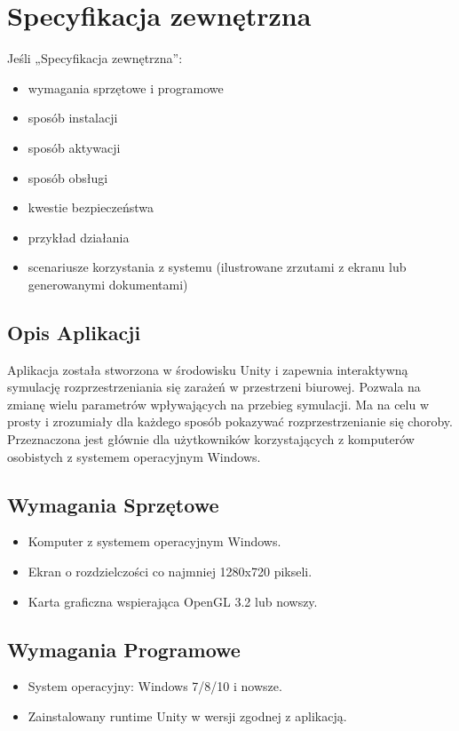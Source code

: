 \chapter{Specyfikacja zewnętrzna}
\label{ch:04}

Jeśli „Specyfikacja zewnętrzna”:
\begin{itemize}
\item  wymagania sprzętowe i programowe
\item  sposób instalacji
\item  sposób aktywacji
\item  sposób obsługi
\item  kwestie bezpieczeństwa
\item  przykład działania
\item  scenariusze korzystania z systemu (ilustrowane zrzutami z ekranu lub generowanymi dokumentami)
\end{itemize}


\section{Opis Aplikacji}

Aplikacja została stworzona w środowisku Unity i zapewnia interaktywną symulację rozprzestrzeniania się zarażeń w przestrzeni biurowej. Pozwala na zmianę wielu parametrów wpływających na przebieg symulacji. Ma na celu w prosty i zrozumiały dla każdego sposób pokazywać rozprzestrzenianie się choroby. Przeznaczona jest głównie dla użytkowników korzystających z komputerów osobistych z systemem operacyjnym Windows.

\section{Wymagania Sprzętowe}

\begin{itemize}
	\item Komputer z systemem operacyjnym Windows.
	\item Ekran o rozdzielczości co najmniej 1280x720 pikseli.
	\item Karta graficzna wspierająca OpenGL 3.2 lub nowszy.
\end{itemize}

\section{Wymagania Programowe}

\begin{itemize}
	\item System operacyjny: Windows 7/8/10 i nowsze.
	\item Zainstalowany runtime Unity w wersji zgodnej z aplikacją.
\end{itemize}

